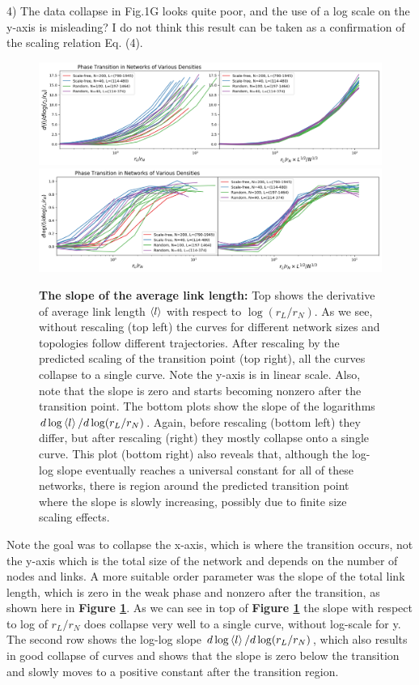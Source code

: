 \documentclass[11pt]{article}
\begin{document}
\begin{response}{
4) The data collapse in Fig.1G looks quite poor, and the use of a log scale on the y-axis is misleading? I do not think this result can be taken as a confirmation of the scaling relation Eq. (4). 
}
\begin{figure}[ht]
    \centering
    \includegraphics[width=\textwidth]{fig-09-19/trans-collapse-dlog.png}
    \includegraphics[width=\textwidth]{fig-09-19/trans-collapse-dlog2.png}
    \caption{{\bf The slope of the average link length:} Top shows the derivative of average link length $\left<l\right>$ with respect to $\log(r_L/r_N)$. 
    As we see, without rescaling (top left) the curves for different network sizes and topologies follow different trajectories. 
    After rescaling by the predicted scaling of the transition point (top right), all the curves collapse to a single curve. 
    Note the y-axis is in linear scale. 
    Also, note that the slope is zero and starts becoming nonzero after the transition point. 
    The bottom plots show the slope of the logarithms $d \log \left<l\right>/d \log (r_L/r_N)$. 
    Again, before rescaling (bottom left) they differ, but after rescaling (right) they mostly collapse onto a single curve.
    This plot (bottom right) also reveals that, although the log-log slope eventually reaches a universal constant for all of these networks, there is region around the predicted transition point where the slope is slowly increasing, possibly due to finite size scaling effects.  
    }
    \label{fig:collapse}
\end{figure}

Note the goal was to collapse the x-axis, which is where the transition occurs, not the y-axis which is the total size of the network and depends on the number of nodes and links. 
A more suitable order parameter was the slope of the total link length, which is zero in the weak phase and nonzero after the transition, as shown here in {\bf Figure \ref{fig:collapse}}. 
As we can see in top of {\bf Figure \ref{fig:collapse}} the slope with respect to log of $r_L/r_N$ does collapse very well to a single curve, without log-scale for y. 
The second row shows the log-log slope $d\log\left<l\right>/d\log(r_L/r_N)$, which also results in good collapse of curves and shows that the slope is zero below the transition and slowly moves to a positive constant after the transition region.   


\end{response}
\end{document}
